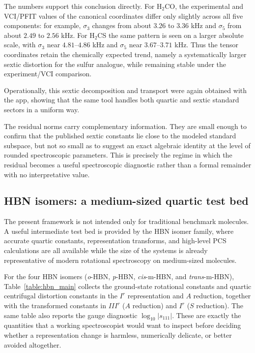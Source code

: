 \documentclass[aip,jcp,reprint,floatfix]{revtex4-2}
\begin{document}
The numbers support this conclusion directly. For H$_2$CO, the experimental
and VCI/PFIT values of the canonical coordinates differ only slightly across
all five components: for example, $\sigma_3$ changes from about $3.26$ to
$3.36$ kHz and $\sigma_5$ from about $2.49$ to $2.56$ kHz. For H$_2$CS the
same pattern is seen on a larger absolute scale, with $\sigma_3$ near
$4.81$--$4.86$ kHz and $\sigma_5$ near $3.67$--$3.71$ kHz. Thus the tensor
coordinates retain the chemically expected trend, namely a systematically
larger sextic distortion for the sulfur analogue, while remaining stable under
the experiment/VCI comparison.

Operationally, this sextic decomposition and transport were again obtained
with the app, showing that the same tool handles both quartic and sextic
standard sectors in a uniform way.

The residual norms carry complementary information. They are small enough to
confirm that the published sextic constants lie close to the modeled standard
subspace, but not so small as to suggest an exact algebraic identity at the
level of rounded spectroscopic parameters. This is precisely the regime in
which the residual becomes a useful spectroscopic diagnostic rather than a
formal remainder with no interpretative value.

\subsection{HBN isomers: a medium-sized quartic test bed}

The present framework is not intended only for traditional benchmark
molecules. A useful intermediate test bed is provided by the HBN isomer
family, where accurate quartic constants, representation transforms, and
high-level PCS calculations are all available while the size of the systems is
already representative of modern rotational spectroscopy on medium-sized
molecules.

For the four HBN isomers (\emph{o}-HBN, \emph{p}-HBN, \emph{cis}-m-HBN, and
\emph{trans}-m-HBN), Table~\ref{table:hbn_main} collects the ground-state
rotational constants and quartic centrifugal distortion constants in the
$I^r$ representation and $A$ reduction, together with the transformed
constants in $III^r$ ($A$ reduction) and $I^r$ ($S$ reduction). The same table
also reports the gauge diagnostic $\log_{10}|s_{111}|$. These are exactly the
quantities that a working spectroscopist would want to inspect before deciding
whether a representation change is harmless, numerically delicate, or better
avoided altogether.
\end{document}
